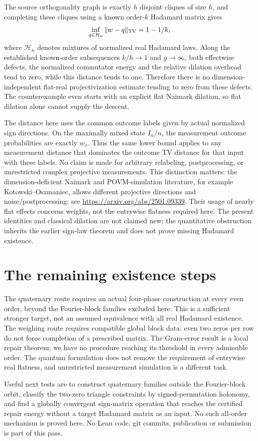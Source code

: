 \documentclass[11pt]{article}
\begin{document}
The source orthogonality graph is exactly $h$ disjoint cliques of
size $h$, and completing these cliques using a known order-$k$
Hadamard matrix gives
\[
 \inf_{q\in\mathcal H_n}\|w-q\|_{\rm TV}=1-1/k,
\]
where $\mathcal H_n$ denotes mixtures of normalized real Hadamard
laws. Along the established known-order subsequences $k/h\to1$ and
$g\to\infty$, both effectwise defects, the normalized commutator
energy and the relative dilation overhead tend to zero, while this
distance tends to one. Therefore there is no dimension-independent
flat-real projectivization estimate tending to zero from these
defects. The counterexample even starts with an explicit flat
Naimark dilation, so flat dilation alone cannot supply the descent.

The distance here uses the common outcome labels given by actual
normalized sign directions. On the maximally mixed state $I_n/n$,
the measurement outcome probabilities are exactly $w_x$. Thus the
same lower bound applies to any measurement distance that dominates
the outcome TV distance for that input with these labels. No claim
is made for arbitrary relabeling, postprocessing, or unrestricted
complex projective measurements. This distinction matters: the
dimension-deficient Naimark and POVM-simulation literature, for
example Kotowski--Oszmaniec, allows different projective directions
and noise/postprocessing; see
\url{https://arxiv.org/abs/2501.09339}. Their usage of nearly flat
effects concerns weights, not the entrywise flatness required here.
The present identities and classical dilation are not claimed new;
the quantitative obstruction inherits the earlier sign-law theorem
and does not prove missing Hadamard existence.

\section{The remaining existence steps}
The quaternary route requires an actual four-phase construction at every
even order, beyond the Fourier-block families excluded here. This is a
sufficient stronger target, not an assumed equivalence with all real
Hadamard existence. The weighing route requires compatible global
block data: even two zeros per row do not force completion of a
prescribed matrix. The Gram-error result is a local repair theorem;
we have no procedure reaching its threshold in every admissible order.
The quantum formulation does not remove the requirement of entrywise
real flatness, and unrestricted measurement simulation is a different task.

Useful next tests are to construct quaternary families outside the
Fourier-block orbit, classify the two-zero triangle constraints by
signed-permutation holonomy, and find a globally convergent sign-matrix
operation that reaches the certified repair energy without a target
Hadamard matrix as an input. No such all-order mechanism is proved here.
No Lean code, git commits, publication or submission is part of this pass.
\end{document}
